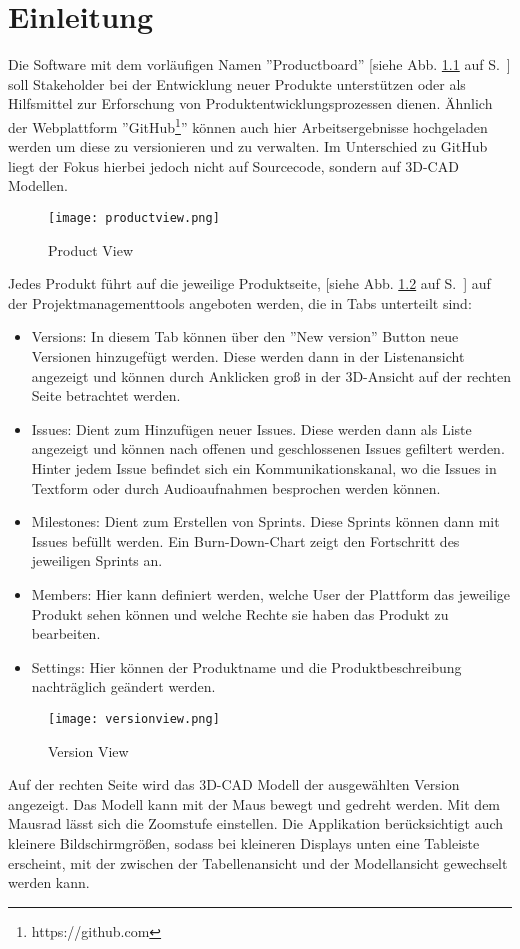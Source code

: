 \chapter{Einleitung}

Die Software mit dem vorläufigen Namen ''Productboard'' [siehe Abb. \ref{fig: productview} auf S.~\pageref{fig: productview}] soll Stakeholder bei der Entwicklung neuer Produkte unterstützen oder als Hilfsmittel zur Erforschung von Produktentwicklungsprozessen dienen. Ähnlich der Webplattform ''GitHub\footnote{https://github.com}'' können auch hier Arbeitsergebnisse hochgeladen werden um diese zu versionieren und zu verwalten. Im Unterschied zu GitHub liegt der Fokus hierbei jedoch nicht auf Sourcecode, sondern auf 3D-CAD Modellen.

\begin{figure}[h]
    \centering
    \texttt{[image: productview.png]}
    \caption{Product View}
    \label{fig: productview}
\end{figure} 

Jedes Produkt führt auf die jeweilige Produktseite, [siehe Abb. \ref{fig: versionview} auf S.~\pageref{fig: versionview}] auf der Projektmanagementtools angeboten werden, die in Tabs unterteilt sind:
\begin{itemize}
	\item Versions: In diesem Tab können über den ''New version'' Button neue Versionen hinzugefügt werden. Diese werden dann in der Listenansicht angezeigt und können durch Anklicken groß in der 3D-Ansicht auf der rechten Seite betrachtet werden.
	\item Issues: Dient zum Hinzufügen neuer Issues. Diese werden dann als Liste angezeigt und können nach offenen und geschlossenen Issues gefiltert werden. Hinter jedem Issue befindet sich ein Kommunikationskanal, wo die Issues in Textform oder durch Audioaufnahmen besprochen werden können.
	\item Milestones: Dient zum Erstellen von Sprints. Diese Sprints können dann mit Issues befüllt werden. Ein Burn-Down-Chart zeigt den Fortschritt des jeweiligen Sprints an.
	\item Members: Hier kann definiert werden, welche User der Plattform das jeweilige Produkt sehen können und welche Rechte sie haben das Produkt zu bearbeiten.
	\item Settings: Hier können der Produktname und die Produktbeschreibung nachträglich geändert werden.
\end{itemize}

\begin{figure}[h]
    \centering
    \texttt{[image: versionview.png]}
    \caption{Version View}
    \label{fig: versionview}
\end{figure}

Auf der rechten Seite wird das 3D-CAD Modell der ausgewählten Version angezeigt. Das Modell kann mit der Maus bewegt und gedreht werden. Mit dem Mausrad lässt sich die Zoomstufe einstellen. Die Applikation berücksichtigt auch kleinere Bildschirmgrößen, sodass bei kleineren Displays unten eine Tableiste erscheint, mit der zwischen der Tabellenansicht und der Modellansicht gewechselt werden kann. 